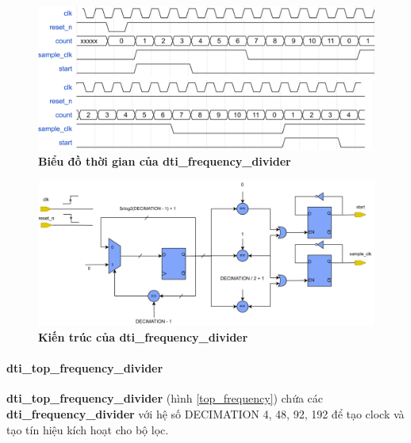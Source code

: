 \begin{figure}[H]
    \centering
    \includegraphics[width=14cm]{Images/Chuong4/frequency/frequency_timing.png}
    \caption[Biểu đồ thời gian của dti\_frequency\_divider]{\bfseries \fontsize{12pt}{0pt}\selectfont Biểu đồ thời gian của dti\_frequency\_divider}
    \label{frequency_tt}
\end{figure}



\begin{figure}[H]
    \centering
    \includegraphics[width=14cm]{Images/Chuong4/frequency/frequency_arc.png}
    \caption[Kiến trúc của dti\_frequency\_divider]{\bfseries \fontsize{12pt}{0pt}\selectfont Kiến trúc của dti\_frequency\_divider}
    \label{frequency_a}
\end{figure}

\paragraph{dti\_top\_frequency\_divider}
\textbf{dti\_top\_frequency\_divider} (hình \ref{top_frequency}) chứa các \textbf{dti\_frequency\_divider} với hệ số DECIMATION 4, 48, 92, 192 để tạo clock và tạo tín hiệu kích hoạt cho bộ lọc.

